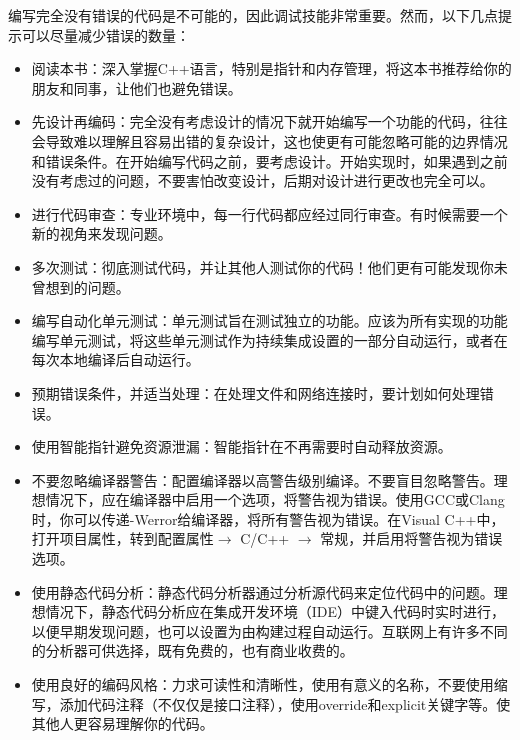 编写完全没有错误的代码是不可能的，因此调试技能非常重要。然而，以下几点提示可以尽量减少错误的数量：

\begin{itemize}
\item
阅读本书：深入掌握C++语言，特别是指针和内存管理，将这本书推荐给你的朋友和同事，让他们也避免错误。

\item
先设计再编码：完全没有考虑设计的情况下就开始编写一个功能的代码，往往会导致难以理解且容易出错的复杂设计，这也使更有可能忽略可能的边界情况和错误条件。在开始编写代码之前，要考虑设计。开始实现时，如果遇到之前没有考虑过的问题，不要害怕改变设计，后期对设计进行更改也完全可以。

\item
进行代码审查：专业环境中，每一行代码都应经过同行审查。有时候需要一个新的视角来发现问题。

\item
多次测试：彻底测试代码，并让其他人测试你的代码！他们更有可能发现你未曾想到的问题。

\item
编写自动化单元测试：单元测试旨在测试独立的功能。应该为所有实现的功能编写单元测试，将这些单元测试作为持续集成设置的一部分自动运行，或者在每次本地编译后自动运行。

\item
预期错误条件，并适当处理：在处理文件和网络连接时，要计划如何处理错误。

\item
使用智能指针避免资源泄漏：智能指针在不再需要时自动释放资源。

\item
不要忽略编译器警告：配置编译器以高警告级别编译。不要盲目忽略警告。理想情况下，应在编译器中启用一个选项，将警告视为错误。使用GCC或Clang时，你可以传递-Werror给编译器，将所有警告视为错误。在Visual C++中，打开项目属性，转到配置属性$\rightarrow$ C/C++ $\rightarrow$ 常规，并启用将警告视为错误选项。

\item
使用静态代码分析：静态代码分析器通过分析源代码来定位代码中的问题。理想情况下，静态代码分析应在集成开发环境（IDE）中键入代码时实时进行，以便早期发现问题，也可以设置为由构建过程自动运行。互联网上有许多不同的分析器可供选择，既有免费的，也有商业收费的。

\item
使用良好的编码风格：力求可读性和清晰性，使用有意义的名称，不要使用缩写，添加代码注释（不仅仅是接口注释），使用override和explicit关键字等。使其他人更容易理解你的代码。
\end{itemize}